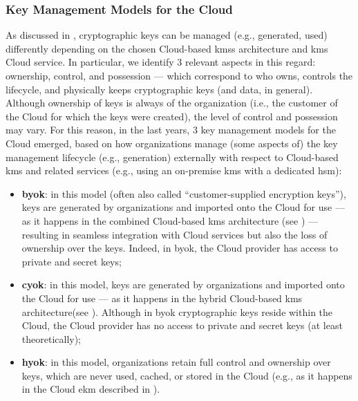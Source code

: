 \subsubsection{Key Management Models for the Cloud}\label{sec:cloud:models}

As discussed in , cryptographic keys can be managed (e.g., generated, used) differently depending on the chosen Cloud-based \glspl{kms} architecture and \gls{kms} Cloud service. In particular, we identify 3 relevant aspects in this regard: ownership, control, and possession --- which correspond to who owns, controls the lifecycle, and physically keeps cryptographic keys (and data, in general). Although ownership of keys is always of the organization (i.e., the customer of the Cloud for which the keys were created), the level of control and possession may vary. For this reason, in the last years, 3 key management models for the Cloud emerged, based on how organizations manage (some aspects of) the key management lifecycle (e.g., generation) externally with respect to Cloud-based \gls{kms} and related services (e.g., using an on-premise \gls{kms} with a dedicated \gls{hsm}):

\begin{itemize}
	\item \textbf{\gls{byok}}: in this model (often also called ``customer-supplied encryption keys''), keys are generated by organizations and imported onto the Cloud for use --- as it happens in the combined Cloud-based \gls{kms} architecture (see ) --- resulting in seamless integration with Cloud services but also the loss of ownership over the keys. Indeed, in \gls{byok}, the Cloud provider has access to private and secret keys;
	\item \textbf{\gls{cyok}}: in this model, keys are generated by organizations and imported onto the Cloud for use --- as it happens in the hybrid Cloud-based \gls{kms} architecture(see ). Although in \gls{byok} cryptographic keys reside within the Cloud, the Cloud provider has no access to private and secret keys (at least theoretically);
	\item \textbf{\gls{hyok}}: in this model, organizations retain full control and ownership over keys, which are never used, cached, or stored in the Cloud (e.g., as it happens in the Cloud \gls{ekm} described in ).
\end{itemize}

